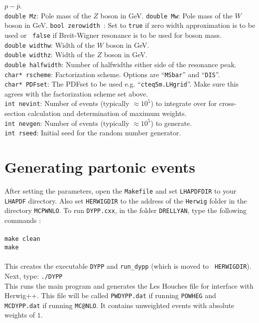 \documentclass[12pt,a4paper,oneside]{article}
\begin{document}
{$p-\bar{p}$. \\
{\tt double Mz}: Pole mass of the $Z$ boson in GeV.
{\tt double Mw}: Pole mass of the $W$ boson in GeV.
{\tt bool zerowidth }: Set to {\tt true} if zero width approximation is to be used or {\tt
  false} if Breit-Wigner resonance is to be used for boson mass. \\
{\tt double widthw}: Width of the $W$ boson in GeV.\\
{\tt double widthz}: Width of the $Z$ boson in GeV.\\
{\tt double halfwidth}: Number of halfwidths either side of the resonance peak. \\
{\tt char* rscheme}: Factorization scheme. Options are ``{\tt MSbar}'' and ``{\tt DIS}''.\\
{\tt char* PDFset}: The PDFset to be used e.g. ``{\tt cteq5m.LHgrid}''. Make sure this agrees with the factorization
scheme set above. \\
{\tt int nevint}: Number of events (typically $ \approx 10^5$) to integrate over for cross-section calculation and
determination of maximum weights. \\
{\tt int nevgen}: Number of events (typically $\approx 10^5$) to generate. \\
{\tt int rseed}:  Initial seed for the random number generator. \\ 

\section{Generating partonic events}
After setting the parameters, open the {\tt Makefile} and set {\tt LHAPDFDIR} to your
{\tt LHAPDF} directory. Also set {\tt HERWIGDIR} to the address of the {\tt Herwig} folder
in the directory {\tt MCPWNLO}. 
To run {\tt DYPP.cxx}, in the folder {\tt DRELLYAN}, type the following commands :\\
\\
{\tt make clean} \\
{\tt make} \\
\\
This creates the executable {\tt DYPP} and {\tt run\_dypp} (which is moved to {\tt
  HERWIGDIR}). Next, type: 
{\tt ./DYPP} \\
This runs the main program and generates the Les Houches file for interface with \textsf{Herwig++}. This file will be called {\tt PWDYPP.dat} if running {\tt POWHEG} and {\tt
  MCDYPP.dat} if running {\tt MC@NLO}. It contains unweighted events with absolute weights
of $1$.
}
\end{document}
